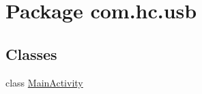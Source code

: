 \hypertarget{namespacecom_1_1hc_1_1usb}{}\section{Package com.\+hc.\+usb}
\label{namespacecom_1_1hc_1_1usb}
\subsection*{Classes}
\begin{DoxyCompactItemize}
\item 
class \mbox{\hyperlink{classcom_1_1hc_1_1usb_1_1_main_activity}{Main\+Activity}}
\end{DoxyCompactItemize}
